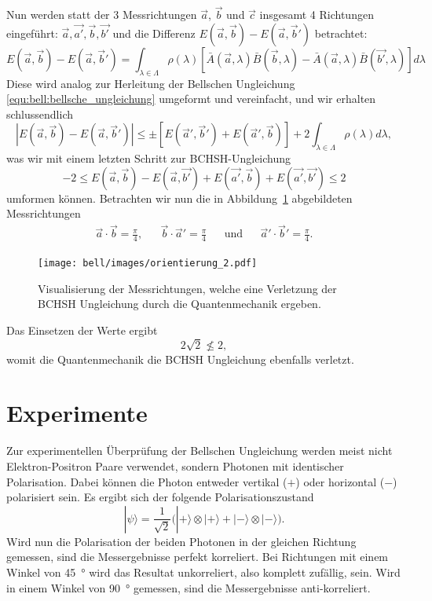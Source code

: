 \begin{refsection}
Nun werden statt der 3 Messrichtungen $\vec{a}$, $\vec{b}$ und $\vec{c}$
insgesamt 4 Richtungen eingef\"uhrt: $\vec{a}, \vec{a'}, \vec{b}, \vec{b'}$
und die Differenz $E(\vec{a},\vec{b}) - E(\vec{a},\vec{b}')$ betrachtet:
\begin{equation}
    E(\vec{a},\vec{b}) - E(\vec{a},\vec{b}') = 
    \int_{\lambda\in\Lambda} \rho(\lambda) \left[
        \bar{A}(\vec{a},\lambda)\bar{B}(\vec{b},\lambda) -
        \bar{A}(\vec{a},\lambda)\bar{B}(\vec{b'},\lambda)
    \right] d\lambda
\end{equation}
Diese wird analog zur Herleitung der Bellschen Ungleichung 
\eqref{equ:bell:bellsche_ungleichung} umgeformt und vereinfacht, und wir
erhalten schlussendlich
\[
    \left| E(\vec{a},\vec{b}) - E(\vec{a},\vec{b}') \right| \leq \pm \left[
        E(\vec{a}',\vec{b}') + E(\vec{a}',\vec{b})
    \right]
    + 2 \int_{\lambda\in\Lambda} \rho(\lambda) d\lambda,
\]
was wir mit einem letzten Schritt zur BCHSH-Ungleichung
\begin{equation}\label{equ:bell:bchsh-ungleichung}
    -2 \leq 
    E(\vec{a},\vec{b}) - E(\vec{a},\vec{b'}) + E(\vec{a'},\vec{b}) + E(\vec{a'},\vec{b'})
    \leq 2
\end{equation}
umformen k\"onnen.
Betrachten wir nun die in Abbildung~\ref{fig:bell:orientierung_2}
abgebildeten Messrichtungen
\begin{align*}
    \vec{a}\cdot\vec{b} = \frac{\pi}{4}, && 
    \vec{b}\cdot\vec{a}' = \frac{\pi}{4} && 
    \text{und} &&
    \vec{a}'\cdot\vec{b}' = \frac{\pi}{4}.
\end{align*}
\begin{figure}
    \centering
    \texttt{[image: bell/images/orientierung\_2.pdf]}
    \caption{Visualisierung der Messrichtungen, welche eine Verletzung der
    BCHSH Ungleichung durch die Quantenmechanik ergeben.}
    \label{fig:bell:orientierung_2}
\end{figure}
Das Einsetzen der Werte ergibt
\[
    2 \sqrt{2} \nleqslant 2,
\]
womit die Quantenmechanik die BCHSH Ungleichung ebenfalls verletzt.

\section{Experimente}
Zur experimentellen \"Uberpr\"ufung der Bellschen Ungleichung werden meist
nicht Elektron-Positron Paare verwendet, sondern
Photonen mit identischer Polarisation.
Dabei k\"onnen die Photon entweder vertikal ($+$) oder horizontal
($-$) polarisiert sein. 
Es ergibt sich der folgende Polarisationszustand
\begin{equation}\label{equ:bell:photonstate}
    |\psi\rangle = \frac{1}{\sqrt{2}} \Big(
        |{+}\rangle \otimes |{+}\rangle + |{-}\rangle \otimes |{-}\rangle
    \Big).
\end{equation}
Wird nun die Polarisation der beiden Photonen in der gleichen Richtung 
gemessen, sind die Messergebnisse perfekt korreliert.
Bei Richtungen mit einem Winkel von \SI{45}{\degree} wird das Resultat
unkorreliert, also komplett zuf\"allig, sein.
Wird in einem Winkel von \SI{90}{\degree} gemessen, sind die Messergebnisse
anti-korreliert.


\end{refsection}
